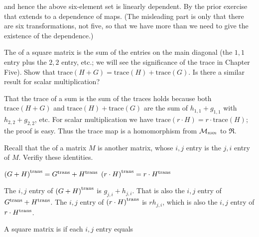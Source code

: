 \begin{exercises}
\begin{answer}
      and hence the above six-element set is linearly dependent.
      By the prior exercise that extends to a dependence of maps.
      (The misleading part is only that there are six transformations, not
      five, so that we have more than we need to give the existence of the 
      dependence.) 
    \end{answer}
  \item 
    The  
    of a square matrix is the sum of the entries on the main diagonal (the
    \( 1,1 \) entry
    plus the \( 2,2 \) entry, etc.;
    we will see the significance of the trace in Chapter Five).
    Show that \( \mbox{trace}(H+G)=\mbox{trace}(H)+\mbox{trace}(G)  \).
    Is there a similar result for scalar multiplication?
    \begin{answer}
      That the trace of a sum is the sum of the traces holds
      because both \( \text{trace}(H+G) \) and
      \( \text{trace}(H)+\text{trace}(G) \) are the sum of
      \( h_{1,1}+g_{1,1} \) with \( h_{2,2}+g_{2,2} \), etc.
      For scalar multiplication we have
      \( \mbox{trace}(r\cdot H)=r\cdot\mbox{trace}(H) \); the proof is easy.
      Thus the trace map is a homomorphism from $\mathcal{M}_{n \! \times \! n}$ to
      $\Re$.  
    \end{answer}
  \item 
    Recall that the %
    of a matrix $M$ is another matrix, whose $i,j$ entry is the 
    $j,i$ entry of $M$.
    Verifiy these identities.
    \begin{exparts}
      \partsitem \( {{(G+H)}^{\rm trans}}={{G}^{\rm trans}}+{{H}^{\rm trans}} \)
      \partsitem \( {{(r\cdot H)}^{\rm trans}}=r\cdot{{H}^{\rm trans}} \)
    \end{exparts}
    \begin{answer} 
      \begin{exparts}
        \partsitem The \( i,j \) entry of \( {{(G+H)}^{\rm trans}} \) is
          \( g_{j,i}+h_{j,i} \).
          That is also the \( i,j \) entry of \( {{G}^{\rm trans}}+{{H}^{\rm trans}} \).
        \partsitem The \( i,j \) entry of \( {{(r\cdot H)}^{\rm trans}} \) is
          \( rh_{j,i} \),
          which is also the \( i,j \) entry of \( r\cdot{{H}^{\rm trans}} \).
      \end{exparts}  
   \end{answer}
  \recommended \item 
    A square matrix is %
     if each \( i,j \) entry equals

\end{exercises}
